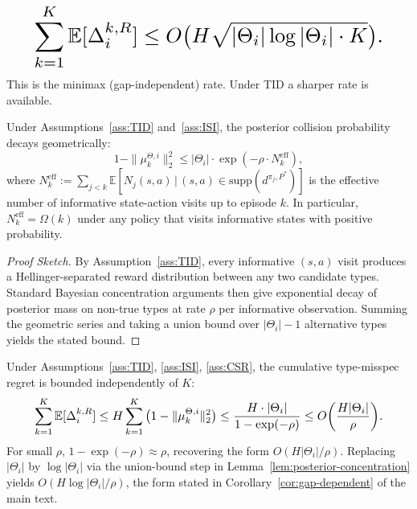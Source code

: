 \begin{equation}\resizebox{0.9\linewidth}{!}{$\displaystyle \sum_{k=1}^K \mathbb{E}[\Delta_i^{k,R}] \leq O\big(H \sqrt{|\Theta_i| \log|\Theta_i| \cdot K}\big). $}\end{equation}
This is the minimax (gap-independent) rate. Under TID a sharper rate is available.

\begin{lemma}
\label{lem:posterior-concentration}
Under Assumptions~\ref{ass:TID} and~\ref{ass:ISI}, the posterior collision probability decays geometrically:
\begin{equation}
1 - \|\mu_k^{\Theta,i}\|_2^2 \leq |\Theta_i| \cdot \exp(-\rho \cdot N_k^{\mathrm{eff}}),
\end{equation}
where $N_k^{\mathrm{eff}} := \sum_{j < k} \mathbb{E}[N_j(s, a) \,\big|\, (s, a) \in \mathrm{supp}(d^{\pi_j, P^*})]$ is the effective number of informative state-action visits up to episode $k$. In particular, $N_k^{\mathrm{eff}} = \Omega(k)$ under any policy that visits informative states with positive probability.
\end{lemma}

\begin{proof}[Proof Sketch]
By Assumption~\ref{ass:TID}, every informative $(s, a)$ visit produces a Hellinger-separated reward distribution between any two candidate types. Standard Bayesian concentration arguments \citep[Theorem 4.2]{ghosal2007convergence} then give exponential decay of posterior mass on non-true types at rate $\rho$ per informative observation. Summing the geometric series and taking a union bound over $|\Theta_i| - 1$ alternative types yields the stated bound.
\end{proof}

\begin{corollary}
\label{cor:gap-dependent-appendix}
Under Assumptions~\ref{ass:TID}, \ref{ass:ISI}, \ref{ass:CSR}, the cumulative type-misspec regret is bounded independently of $K$:
\begin{equation}\resizebox{0.9\linewidth}{!}{$\displaystyle \sum_{k=1}^K \mathbb{E}[\Delta_i^{k,R}] \leq H \sum_{k=1}^K \big(1 - \|\mu_k^{\Theta,i}\|_2^2\big) \leq \frac{H \cdot |\Theta_i|}{1 - \exp(-\rho)} \leq O\bigg(\frac{H |\Theta_i|}{\rho}\bigg). $}\end{equation}
For small $\rho$, $1 - \exp(-\rho) \approx \rho$, recovering the form $O(H |\Theta_i|/\rho)$. Replacing $|\Theta_i|$ by $\log|\Theta_i|$ via the union-bound step in Lemma~\ref{lem:posterior-concentration} yields $O(H \log|\Theta_i|/\rho)$, the form stated in Corollary~\ref{cor:gap-dependent} of the main text.
\end{corollary}

